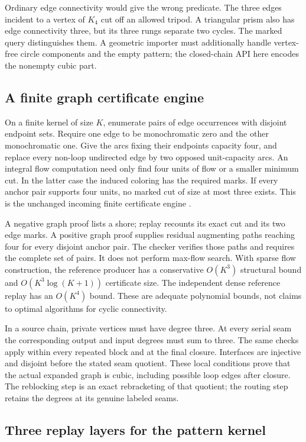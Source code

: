 Ordinary edge connectivity would give the wrong predicate. The three edges
incident to a vertex of $K_4$ cut off an allowed tripod. A triangular prism
also has edge connectivity three, but its three rungs separate two cycles.
The marked query distinguishes them. A geometric importer must additionally
handle vertex-free circle components and the empty pattern; the closed-chain
API here encodes the nonempty cubic part.

\subsection{A finite graph certificate engine}

On a finite kernel of size $K$, enumerate pairs of edge occurrences with
disjoint endpoint sets. Require one edge to be monochromatic zero and the
other monochromatic one. Give the arcs fixing their endpoints capacity four,
and replace every non-loop undirected edge by two opposed unit-capacity arcs.
An integral flow computation need only find four units of flow or a smaller
minimum cut. In the latter case the induced coloring has the required marks.
If every anchor pair supports four units, no marked cut of size at most three
exists. This is the unchanged incoming finite certificate engine
\cite{incoming-four-copy}.

A negative graph proof lists a shore; replay recounts its exact cut and its
two edge marks. A positive graph proof supplies residual augmenting paths
reaching four for every disjoint anchor pair. The checker verifies those paths
and requires the complete set of pairs. It does not perform max-flow search.
With sparse flow construction, the reference producer has a conservative
$O(K^3)$ structural bound and $O(K^3\log(K+1))$ certificate size. The
independent dense reference replay has an $O(K^4)$ bound. These are adequate
polynomial bounds, not claims to optimal algorithms for cyclic connectivity.

In a source chain, private vertices must have degree three. At every serial
seam the corresponding output and input degrees must sum to three. The same
checks apply within every repeated block and at the final closure. Interfaces
are injective and disjoint before the stated seam quotient. These local
conditions prove that the actual expanded graph is cubic, including possible
loop edges after closure. The reblocking step is an exact rebracketing of that
quotient; the routing step retains the degrees at its genuine labeled seams.

\subsection{Three replay layers for the pattern kernel}

